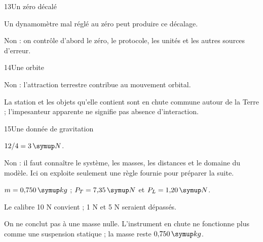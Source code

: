 \par\noindent\begin{minipage}{\linewidth}
\begin{corrige}{13}{Un zéro décalé}
\begin{questions}
\item Un dynamomètre mal réglé au zéro peut produire ce décalage.
\item Non : on contrôle d’abord le zéro, le protocole, les unités et les autres sources d’erreur.
\end{questions}
\end{corrige}
\end{minipage}
\par\noindent\begin{minipage}{\linewidth}
\begin{corrige}{14}{Une orbite}
\begin{questions}
\item Non : l’attraction terrestre contribue au mouvement orbital.
\item La station et les objets qu’elle contient sont en chute commune autour de la Terre ; l’impesanteur apparente ne signifie pas absence d’interaction.
\end{questions}
\end{corrige}
\end{minipage}
\par\noindent\begin{minipage}{\linewidth}
\begin{corrige}{15}{Une donnée de gravitation}
\begin{questions}
\item $12/4=3\unite N$.
\item Non : il faut connaître le système, les masses, les distances et le domaine du modèle. Ici on exploite seulement une règle fournie pour préparer la suite.
\end{questions}
\end{corrige}
\end{minipage}
\par\noindent\begin{minipage}{\linewidth}
\label{cor-defi-11}\begin{questions}
\item $m=0{,}750\unite{kg}$ ; $P_T=7{,}35\unite N$ et $P_L=1{,}20\unite N$.
\item Le calibre 10 N convient ; 1 N et 5 N seraient dépassés.
\item On ne conclut pas à une masse nulle. L’instrument en chute ne fonctionne plus comme une suspension statique ; la masse reste $0{,}750\unite{kg}$.
\end{questions}
\end{minipage}
